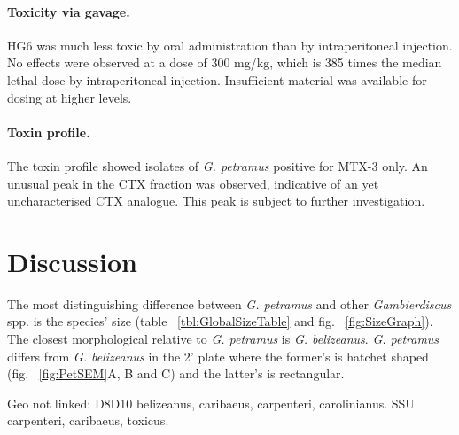 \documentclass[12pt]{article}
\begin{document}
\paragraph{Toxicity via gavage.}
 HG6 was much less toxic by oral administration than by intraperitoneal injection. No effects were observed at a dose of 300 mg/kg, which is 385 times the median lethal dose by intraperitoneal injection. Insufficient material was available for dosing at higher levels.​



\paragraph{Toxin profile.}
The toxin profile showed isolates of \emph{G. petramus} positive for MTX-3 only. An unusual peak in the CTX fraction was observed, indicative of an yet uncharacterised CTX analogue. This peak is subject to further investigation. \\

\newpage
\section{Discussion}
The most distinguishing difference between \emph{G. petramus} and other \emph{Gambierdiscus} spp. is the species' size (table ~\ref{tbl:GlobalSizeTable} and fig. ~\ref{fig:SizeGraph}). The closest morphological relative to \emph{G. petramus} is \emph{G. belizeanus}. \emph{G. petramus} differs from \emph{G. belizeanus} in the 2' plate where the former's is hatchet shaped (fig. ~\ref{fig:PetSEM}A, B and C) and the latter's is rectangular.  

Geo not linked: D8D10 belizeanus, caribaeus, carpenteri, carolinianus. SSU carpenteri, caribaeus, toxicus.
\end{document}
